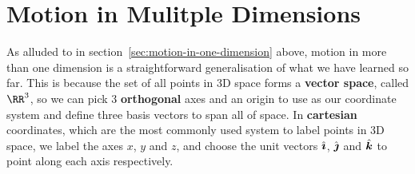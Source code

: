 \documentclass[../classical_mechanics.tex]{subfiles}
\begin{document}
    \section{Motion in Mulitple Dimensions}\label{sec:motion-in-multiple-dimensions}
        As alluded to in section~\ref{sec:motion-in-one-dimension} above, motion in more than one dimension is a straightforward generalisation of what we have learned so far.
        This is because the set of all points in 3D space forms a \textbf{vector space}, called $\RR^3$, so we can pick 3 \textbf{orthogonal} axes and an origin to use as our coordinate system and define three basis vectors to span all of space.
        In \textbf{cartesian} coordinates, which are the most commonly used system to label points in 3D space, we label the axes $x$, $y$ and $z$, and choose the unit vectors $\hat{\boldsymbol{\imath}}$, $\hat{\boldsymbol{\jmath}}$ and $\hat{\boldsymbol{k}}$ to point along each axis respectively.
        \begin{figure}[H]
            \centering
        \end{figure}
\end{document}
